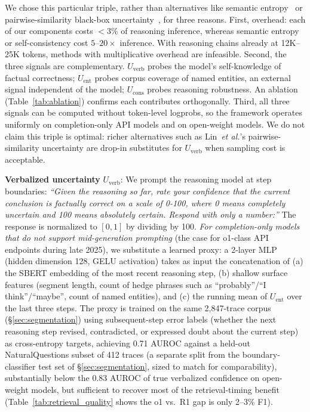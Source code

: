 \documentclass[sigconf,natbib=true]{acmart}
\newcommand{\etal}{\textit{et al.}}
\begin{document}
We chose this particular triple, rather than alternatives like semantic entropy~\cite{kuhn2023semantic} or pairwise-similarity black-box uncertainty~\cite{lin2024generating}, for three reasons. First, overhead: each of our components costs $<3\%$ of reasoning inference, whereas semantic entropy or self-consistency cost $5$--$20\times$ inference. With reasoning chains already at 12K--25K tokens, methods with multiplicative overhead are infeasible. Second, the three signals are complementary. $U_{\text{verb}}$ probes the model's self-knowledge of factual correctness; $U_{\text{ent}}$ probes corpus coverage of named entities, an external signal independent of the model; $U_{\text{cons}}$ probes reasoning robustness. An ablation (Table~\ref{tab:ablation}) confirms each contributes orthogonally. Third, all three signals can be computed without token-level logprobs, so the framework operates uniformly on completion-only API models and on open-weight models. We do not claim this triple is optimal: richer alternatives such as Lin~\etal{}'s pairwise-similarity uncertainty are drop-in substitutes for $U_{\text{verb}}$ when sampling cost is acceptable.

\textbf{Verbalized uncertainty} $U_{\text{verb}}$: We prompt the reasoning model at step boundaries: \emph{``Given the reasoning so far, rate your confidence that the current conclusion is factually correct on a scale of 0-100, where 0 means completely uncertain and 100 means absolutely certain. Respond with only a number:''} The response is normalized to $[0, 1]$ by dividing by 100. \emph{For completion-only models that do not support mid-generation prompting} (the case for o1-class API endpoints during late 2025), we substitute a learned proxy: a 2-layer MLP (hidden dimension 128, GELU activation) takes as input the concatenation of (a) the SBERT embedding of the most recent reasoning step, (b) shallow surface features (segment length, count of hedge phrases such as ``probably''/``I think''/``maybe'', count of named entities), and (c) the running mean of $U_{\text{ent}}$ over the last three steps. The proxy is trained on the same 2,847-trace corpus (\S\ref{sec:segmentation}) using subsequent-step error labels (whether the next reasoning step revised, contradicted, or expressed doubt about the current step) as cross-entropy targets, achieving 0.71 AUROC against a held-out NaturalQuestions subset of 412 traces (a separate split from the boundary-classifier test set of \S\ref{sec:segmentation}, sized to match for comparability), substantially below the 0.83 AUROC of true verbalized confidence on open-weight models, but sufficient to recover most of the retrieval-timing benefit (Table~\ref{tab:retrieval_quality} shows the o1 vs.\ R1 gap is only 2--3\% F1).
\end{document}
